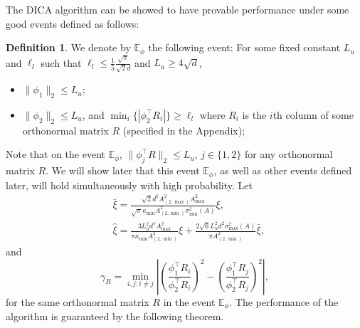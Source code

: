\documentclass[twoside]{article}
\newcommand{\Ephione}{\mathbb{E}_{\phi_1}}
\newcommand{\Ephitwo}{\mathbb{E}_{\phi_2}}
\newcommand{\Ephi}{\mathbb{E}_{\phi}}
\theoremstyle{definition}
\newtheorem{definition}[lemma]{Definition}
\begin{document}
The DICA algorithm can be showed to have provable performance under some good events defined as follows:
\begin{definition}
We denote by $\Ephi$ the following event:
For some fixed constant $L_u$ and $\ell_l$ such that $\ell_l \le \frac{1}{5}\frac{\sqrt{\pi}}{\sqrt{2}d}$ and $L_u \ge 4\sqrt{d}$,
\begin{itemize}
\item $\|\phi_1\|_2 \le L_u$;
\item $\|\phi_2\|_2 \le L_u$, and $\min_i \{|\phi_2^{\top}R_i|\} \ge \ell_l$ where $R_i$ is the $i$th column of some orthonormal matrix $R$ (specified in the Appendix);
\end{itemize} 
\end{definition}  
Note that on the event $\Ephi$, $\|\phi_j^{\top}R\|_2\le L_u$, $j\in\{1,2\}$ for any orthonormal matrix $R$. 
We will show later that this event $\Ephi$, as well as other events defined later, will hold simultaneously with high probability.
Let 
\begin{align*}
& \bar{\xi} =   \frac{\sqrt{2}d^6A_{(2,\max)}^2A_{\max}^2}{\sqrt{\pi}\kappa_{\min}A^2_{(2,\min)}\sigma_{\min}^2(A)}\xi, \\
& \widehat{\xi} = \frac{3L_u^2d^7A^2_{\max}}{\pi\kappa_{\min}A^2_{(2,\min)}}\xi + \frac{2\sqrt{6}L_u^2d^2\sigma_{\max}^2(A)}{\pi A^2_{(2,\min)}}\bar{\xi},
\end{align*} 
and 
\begin{equation}
\label{def:gammaR}
\gamma_R =  \min_{i,j: i\neq j} \left\vert \left(\frac{\phi_1^{\top}R_i}{\phi_2^{\top}R_i}\right)^2 - \left(\frac{\phi_1^{\top}R_j}{\phi_2^{\top}R_j}\right)^2 \right\vert, 
\end{equation}
for the same orthonormal matrix $R$ in the event $\Ephi$.
The performance of the algorithm is guaranteed by the following theorem.
\end{document}
